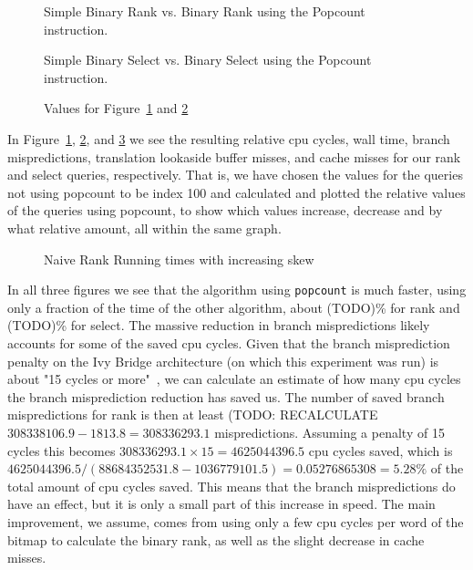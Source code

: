 \begin{figure}
\caption{Simple Binary Rank vs. Binary Rank using the Popcount instruction.}
\label{fig:rankPopcountDiff}

\end{figure}

\begin{figure}
\caption{Simple Binary Select vs. Binary Select using the Popcount instruction.}
\label{fig:selectPopcountDiff}

\end{figure}

\begin{figure}
\caption{Values for Figure~\ref{fig:rankPopcountDiff} and \ref{fig:selectPopcountDiff}}
\label{fig:valuesForPopcountDiff}

\end{figure}

In Figure~\ref{fig:rankPopcountDiff}, \ref{fig:selectPopcountDiff}, and \ref{fig:valuesForPopcountDiff} we see the resulting relative cpu cycles, wall time, branch mispredictions, translation lookaside buffer misses, and cache misses for our rank and select queries, respectively.
That is, we have chosen the values for the queries not using popcount to be index 100 and calculated and plotted the relative values of the queries using popcount, to show which values increase, decrease and by what relative amount, all within the same graph.

\begin{figure}
\caption{Naive Rank Running times with increasing skew}
\label{fig:NaiveRankSkewRunningTime}

\end{figure}

In all three figures we see that the algorithm using \texttt{popcount} is much faster, using only a fraction of the time of the other algorithm, about (TODO)\% for rank and (TODO)\% for select.
The massive reduction in branch mispredictions likely accounts for some of the saved cpu cycles.
Given that the branch misprediction penalty on the Ivy Bridge architecture (on which this experiment was run) is about "15 cycles or more"~\cite{agner}, we can calculate an estimate of how many cpu cycles the branch misprediction reduction has saved us.
The number of saved branch mispredictions for rank is then at least (TODO: RECALCULATE $\num{308338106.9} - \num{1813.8} = \num{308336293.1}$ mispredictions. Assuming a penalty of 15 cycles this becomes $\num{308336293.1} \times 15 = \num{4625044396.5}$ cpu cycles saved, which is $\num{4625044396.5} / (\num{88684352531.8} - \num{1036779101.5}) = \num{0.05276865308} = 5.28\%$ of the total amount of cpu cycles saved.
This means that the branch mispredictions do have an effect, but it is only a small part of this increase in speed. The main improvement, we assume, comes from using only a few cpu cycles per word of the bitmap to calculate the binary rank, as well as the slight decrease in cache misses.

